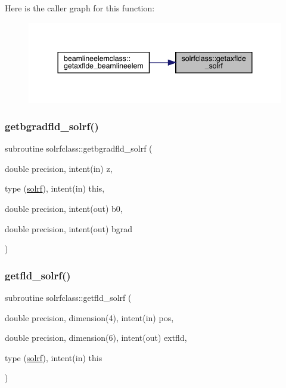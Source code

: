 Here is the caller graph for this function\+:\nopagebreak
\begin{figure}[H]
\begin{center}
\leavevmode
\includegraphics[width=344pt]{namespacesolrfclass_a1033b422b682ef72ecc3b482c38b5065_icgraph}
\end{center}
\end{figure}
\mbox{\label{namespacesolrfclass_adf7673f885573c8468f07faebc432d7d}} 
\subsubsection{\texorpdfstring{getbgradfld\_solrf()}{getbgradfld\_solrf()}}
{\footnotesize\ttfamily subroutine solrfclass\+::getbgradfld\+\_\+solrf (\begin{DoxyParamCaption}\item[{double precision, intent(in)}]{z,  }\item[{type (\mbox{\hyperlink{namespacesolrfclass_structsolrfclass_1_1solrf}{solrf}}), intent(in)}]{this,  }\item[{double precision, intent(out)}]{b0,  }\item[{double precision, intent(out)}]{bgrad }\end{DoxyParamCaption})}

\mbox{\label{namespacesolrfclass_a394f9bb9d3b50c8652a704f3c5af16ef}} 
\subsubsection{\texorpdfstring{getfld\_solrf()}{getfld\_solrf()}}
{\footnotesize\ttfamily subroutine solrfclass\+::getfld\+\_\+solrf (\begin{DoxyParamCaption}\item[{double precision, dimension(4), intent(in)}]{pos,  }\item[{double precision, dimension(6), intent(out)}]{extfld,  }\item[{type (\mbox{\hyperlink{namespacesolrfclass_structsolrfclass_1_1solrf}{solrf}}), intent(in)}]{this }\end{DoxyParamCaption})}




